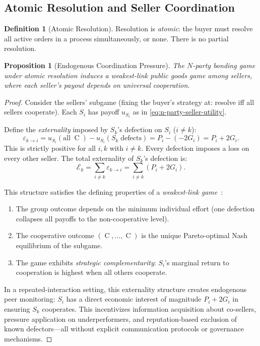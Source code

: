 \documentclass[11pt,a4paper]{article}
\newtheorem{proposition}[theorem]{Proposition}
\theoremstyle{definition}
\newtheorem{definition}[theorem]{Definition}
\theoremstyle{remark}
\newcommand{\pay}{P}           %
\newcommand{\cumval}{G}        %
\DeclareMathOperator{\Coop}{C}
\begin{document}
\subsection{Atomic Resolution and Seller Coordination}

\begin{definition}[Atomic Resolution]
\label{def:atomic-resolution}
Resolution is \emph{atomic}: the buyer must resolve all active orders
in a process simultaneously, or none. There is no partial resolution.
\end{definition}

\begin{proposition}[Endogenous Coordination Pressure]
\label{prop:coordination-pressure}
The $N$-party bonding game under atomic resolution induces a
\emph{weakest-link public goods game} among sellers, where each
seller's payout depends on universal cooperation.
\end{proposition}

\begin{proof}
Consider the sellers' subgame (fixing the buyer's strategy at: resolve
iff all sellers cooperate). Each $S_i$ has payoff
$u_{S_i}$ as in \eqref{eq:n-party-seller-utility}.

Define the \emph{externality} imposed by $S_k$'s defection on $S_i$
($i \neq k$):
\begin{equation}
  \varepsilon_{k \to i}
    = u_{S_i}(\text{all}\;\Coop) - u_{S_i}(S_k\;\text{defects})
    = \pay_i - (-2\cumval_i)
    = \pay_i + 2\cumval_i.
\end{equation}
This is strictly positive for all $i, k$ with $i \neq k$. Every
defection imposes a loss on every other seller. The total externality
of $S_k$'s defection is:
\begin{equation}
  \mathcal{E}_k = \sum_{i \neq k} \varepsilon_{k \to i}
    = \sum_{i \neq k} (\pay_i + 2\cumval_i).
\end{equation}

This structure satisfies the defining properties of a \emph{weakest-link
game}~\citep{hirshleifer1983}:
\begin{enumerate}
  \item The group outcome depends on the minimum individual effort
    (one defection collapses all payoffs to the non-cooperative level).
  \item The cooperative outcome $(\Coop, \ldots, \Coop)$ is the unique
    Pareto-optimal Nash equilibrium of the subgame.
  \item The game exhibits \emph{strategic complementarity}: $S_i$'s
    marginal return to cooperation is highest when all others cooperate.
\end{enumerate}

In a repeated-interaction setting, this externality structure creates
endogenous peer monitoring: $S_i$ has a direct economic interest of
magnitude $\pay_i + 2\cumval_i$ in ensuring $S_k$ cooperates. This
incentivizes information acquisition about co-sellers, pressure
application on underperformers, and reputation-based exclusion of known
defectors---all without explicit communication protocols or governance
mechanisms.
\end{proof}
\end{document}
